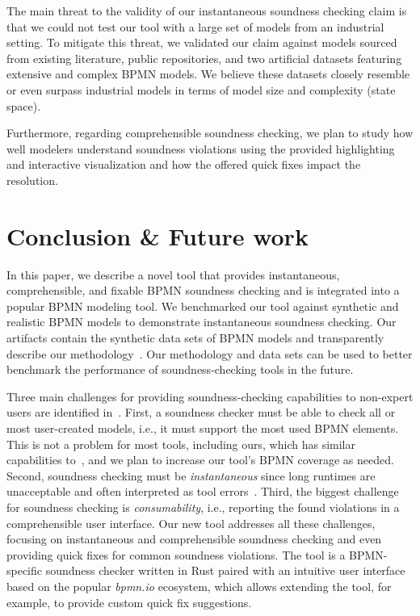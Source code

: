 \documentclass[runningheads]{llncs}
\begin{document}
The main threat to the validity of our instantaneous soundness checking claim is that we could not test our tool with a large set of models from an industrial setting.
To mitigate this threat, we validated our claim against models sourced from existing literature, public repositories, and two artificial datasets featuring extensive and complex BPMN models.
We believe these datasets closely resemble or even surpass industrial models in terms of model size and complexity (state space).

Furthermore, regarding comprehensible soundness checking, we plan to study how well modelers understand soundness violations using the provided highlighting and interactive visualization and how the offered quick fixes impact the resolution.

\section{Conclusion \& Future work} \label{sec:conclusion}
In this paper, we describe a novel tool that provides instantaneous, comprehensible, and fixable BPMN soundness checking and is integrated into a popular BPMN modeling tool.
We benchmarked our tool against synthetic and realistic BPMN models to demonstrate instantaneous soundness checking.
Our artifacts contain the synthetic data sets of BPMN models and transparently describe our methodology~\cite{noauthorgivenBPM2024Artifacts2024}.
Our methodology and data sets can be used to better benchmark the performance of soundness-checking tools in the future.

Three main challenges for providing soundness-checking capabilities to non-expert users are identified in~\cite{fahlandAnalysisDemandInstantaneous2011}.
First, a soundness checker must be able to check all or most user-created models, i.e., it must support the most used BPMN elements.
This is not a problem for most tools, including ours, which has similar capabilities to~\cite{corradiniFormalApproachAnalysis2021}, and we plan to increase our tool's BPMN coverage as needed.
Second, soundness checking must be \textit{instantaneous} since long runtimes are unacceptable and often interpreted as tool errors~\cite{fahlandAnalysisDemandInstantaneous2011}.
Third, the biggest challenge for soundness checking is \textit{consumability}, i.e., reporting the found violations in a comprehensible user interface.
Our new tool addresses all these challenges, focusing on instantaneous and comprehensible soundness checking and even providing quick fixes for common soundness violations.
The tool is a BPMN-specific soundness checker written in Rust paired with an intuitive user interface based on the popular \textit{bpmn.io} ecosystem, which allows extending the tool, for example, to provide custom quick fix suggestions.
\end{document}
